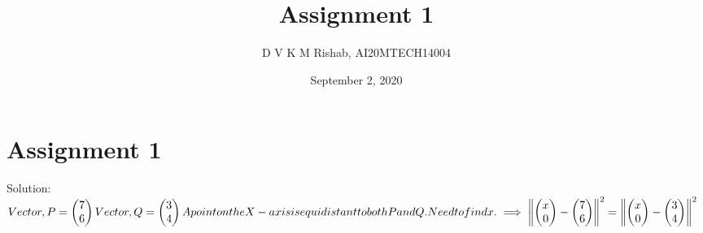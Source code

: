 \documentclass{article}
\title{Assignment 1}
\author{D V K M Rishab, AI20MTECH14004 }
\date{September 2, 2020}
\begin{document}
\maketitle

\section*{Assignment 1}
 Solution: 
 \newline \newline
 \begin{math}
 Vector, P = \begin{pmatrix} 7 \\ 6 \\ \end{pmatrix} \newline \newline \newline
 Vector, Q = \begin{pmatrix} 3 \\ 4 \\ \end{pmatrix} \newline \newline \newline
 A point on the X-axis is equidistant to both P and Q. \newline \newline
 Need to find x. \newline \newline
 \implies 
 \left\lVert \begin{pmatrix} x \\ 0 \\ \end{pmatrix} - \begin{pmatrix} 7 \\ 6 \\ \end{pmatrix} \right\rVert^2 = \left\lVert \begin{pmatrix} x \\ 0 \\ \end{pmatrix} - \begin{pmatrix} 3 \\ 4 \\ \end{pmatrix} \right\rVert^2 \newline \newline \newline \newline

\end{math}
\end{document}
